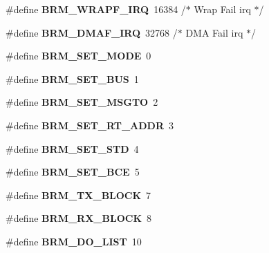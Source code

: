 \begin{DoxyCompactItemize}
\#define {\bfseries B\+R\+M\+\_\+\+W\+R\+A\+P\+F\+\_\+\+I\+RQ}~16384                /$\ast$ Wrap Fail irq $\ast$/
\item 
\mbox{\label{group__B1553BRM_gacd2b029b580ae148cbe4d28db98c2cc4}} 
\#define {\bfseries B\+R\+M\+\_\+\+D\+M\+A\+F\+\_\+\+I\+RQ}~32768                /$\ast$ D\+MA Fail irq $\ast$/
\item 
\mbox{\label{group__B1553BRM_ga05bb937046525c6d01ad865ab00cf166}} 
\#define {\bfseries B\+R\+M\+\_\+\+S\+E\+T\+\_\+\+M\+O\+DE}~0
\item 
\mbox{\label{group__B1553BRM_gaef23a6321a40dcaa04f50ec0dcecfe07}} 
\#define {\bfseries B\+R\+M\+\_\+\+S\+E\+T\+\_\+\+B\+US}~1
\item 
\mbox{\label{group__B1553BRM_ga0323a0b35f1452ab3191393a4ed23341}} 
\#define {\bfseries B\+R\+M\+\_\+\+S\+E\+T\+\_\+\+M\+S\+G\+TO}~2
\item 
\mbox{\label{group__B1553BRM_ga45e9b9ddeb65b8c86cc02c1c900603ad}} 
\#define {\bfseries B\+R\+M\+\_\+\+S\+E\+T\+\_\+\+R\+T\+\_\+\+A\+D\+DR}~3
\item 
\mbox{\label{group__B1553BRM_gae42c640318c0102f95ef2a5cbe91cd54}} 
\#define {\bfseries B\+R\+M\+\_\+\+S\+E\+T\+\_\+\+S\+TD}~4
\item 
\mbox{\label{group__B1553BRM_ga6150d812ede2bb5cd075cbb46cac11c8}} 
\#define {\bfseries B\+R\+M\+\_\+\+S\+E\+T\+\_\+\+B\+CE}~5
\item 
\mbox{\label{group__B1553BRM_ga6b8371078df646139bae3b3234d5327d}} 
\#define {\bfseries B\+R\+M\+\_\+\+T\+X\+\_\+\+B\+L\+O\+CK}~7
\item 
\mbox{\label{group__B1553BRM_ga04c6dd32b85c28beacb673d7acef0c73}} 
\#define {\bfseries B\+R\+M\+\_\+\+R\+X\+\_\+\+B\+L\+O\+CK}~8
\item 
\mbox{\label{group__B1553BRM_gad799a18e0306fe84526009c4b65b153a}} 
\#define {\bfseries B\+R\+M\+\_\+\+D\+O\+\_\+\+L\+I\+ST}~10
\item 

\end{DoxyCompactItemize}
